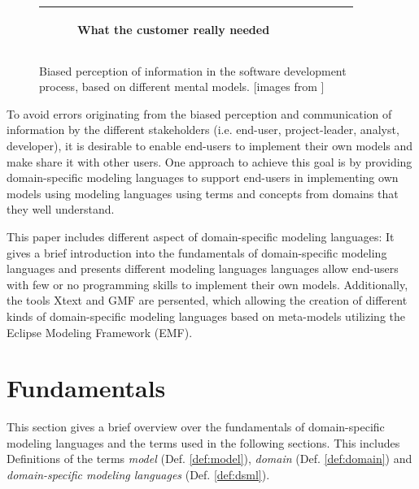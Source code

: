 \documentclass[runningheads,a4paper]{llncs}
\begin{document}
\begin{figure}[h]
\begin{center}
\begin{tabular}{|c|c|c|c|c|}
\begin{subfigure}[t]{0.15\textwidth}
\caption*{\tiny \centering What the customer really needed}\label{fig:whatneeded}\end{subfigure}\\
\hline
\end{tabular}
\caption{Biased perception of information in the software development process, based on different mental models. [images from \cite{projectcartoon}]}
\label{fig:swingexample}
\end{center}
\end{figure}
To avoid errors originating from the biased perception and communication of information by the different stakeholders (i.e. end-user, project-leader, analyst, developer), 
it is desirable to enable end-users to implement their own models and make share it with other users. 
One approach to achieve this goal is by providing domain-specific modeling languages to support 
end-users in implementing own models using modeling languages using terms and concepts from domains that they well understand.

This paper includes different aspect of domain-specific modeling languages:
It gives a brief introduction into the fundamentals of domain-specific modeling languages and presents
different  modeling languages languages allow end-users with few or no
programming skills to implement their own models.
Additionally, the tools Xtext and GMF are persented, which allowing the creation of different kinds of domain-specific modeling languages
based on meta-models utilizing the Eclipse Modeling Framework (EMF).


\section{Fundamentals}
\label{section:fundamentals}
This section gives a brief overview over the fundamentals of domain-specific modeling languages 
and the terms used in the following sections. This includes Definitions of the terms \emph{model} (Def. \ref{def:model}), 
\emph{domain} (Def. \ref{def:domain}) and \emph{domain-specific modeling languages} (Def. \ref{def:dsml}).
\end{document}
